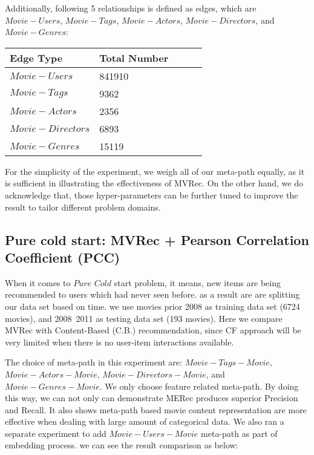 Additionally, following 5 relationships is defined as edges, which are $Movie-Users$, $Movie-Tags$, $Movie-Actors$, $Movie-Directors$, and $Movie-Genres$:

\begin{center}
    \begin{tabular}{|l|l|l|l|l|}
    \hline
     \textbf{Edge Type} & \textbf{Total Number} \\ \hline
     $Movie-Users$ &  841910\\ \hline
     $Movie-Tags$ &   9362 \\ \hline
     $Movie-Actors$ &  2356 \\ \hline
     $Movie-Directors$ &  6893 \\ \hline
     $Movie-Genres$ &  15119 \\ \hline
    \end{tabular}
\end{center}

For the simplicity of the experiment, we weigh all of our meta-path equally, as it is sufficient in illustrating the effectiveness of MVRec. On the other hand, we do acknowledge that, those hyper-parameters can be further tuned to improve the result to tailor different problem domains. 


\subsection{Pure cold start: MVRec + Pearson Correlation Coefficient (PCC)}
When it comes to $Pure$ $Cold$ start problem, it means, new items are being recommended to users which had never seen before. as a result are are splitting our data set based on time.
we use movies prior 2008 as training data set (6724 movies), and 2008~2011 as testing data set (193 movies). Here we compare MVRec with Content-Based (C.B.) recommendation, since CF approach will be very limited when there is no user-item interactions available.

The choice of meta-path in this experiment are: $Movie-Tags-Movie$, $Movie-Actors-Movie$, $Movie-Directors-Movie$, and $Movie-Genres-Movie$. We only choose feature related meta-path. By doing this way, we can not only can demonstrate MERec produces superior Precision and Recall. It also shows meta-path based movie content representation are more effective when dealing with large amount of categorical data. 
We also ran a separate experiment to add $Movie-Users-Movie$ meta-path as part of embedding process. we can see the result comparison as below:


